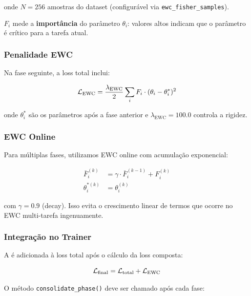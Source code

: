 onde $N = 256$ amostras do dataset (configur\'avel via
\texttt{ewc\_fisher\_samples}).

$F_i$ mede a \textbf{import\^ancia} do par\^ametro $\theta_i$: valores altos
indicam que o par\^ametro \'e cr\'itico para a tarefa atual.

\subsubsection{Penalidade EWC}

Na fase seguinte, a loss total inclui:

\begin{equation}
    \mathcal{L}_{\text{EWC}} = \frac{\lambda_{\text{EWC}}}{2} \sum_{i} F_i \cdot (\theta_i - \theta_i^*)^2
    \label{eq:ewc_loss}
\end{equation}

onde $\theta_i^*$ s\~ao os par\^ametros ap\'os a fase anterior e
$\lambda_{\text{EWC}} = 100.0$ controla a rigidez.

\subsubsection{EWC Online}

Para m\'ultiplas fases, utilizamos EWC online
\cite{schwarz2018progress} com acumula\c{c}\~ao exponencial:

\begin{align}
    \bar{F}_i^{(k)} &= \gamma \cdot \bar{F}_i^{(k-1)} + F_i^{(k)} \label{eq:ewc_online} \\
    \theta_i^{*(k)} &= \theta_i^{(k)}
\end{align}

com $\gamma = 0.9$ (decay). Isso evita o crescimento linear de termos
que ocorre no EWC multi-tarefa ingenuamente.

\subsubsection{Integra\c{c}\~ao no Trainer}

A  \'e adicionada {\`a} loss total ap\'os o c\'alculo da
loss composta:

\begin{equation}
    \mathcal{L}_{\text{final}} = \mathcal{L}_{\text{total}} + \mathcal{L}_{\text{EWC}}
\end{equation}

O m\'etodo \texttt{consolidate\_phase()} deve ser chamado ap\'os cada
fase:

